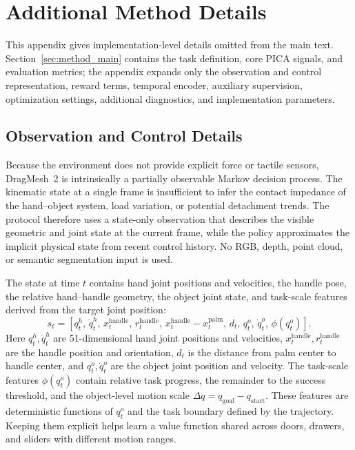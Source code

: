 \appendix

\section{Additional Method Details}
\label{sec:framework}

This appendix gives implementation-level details omitted from the
main text. Section~\ref{sec:method_main} contains the task
definition, core PICA signals, and evaluation metrics; the appendix
expands only the observation and control representation, reward
terms, temporal encoder, auxiliary supervision, optimization
settings, additional diagnostics, and implementation parameters.

\subsection{Observation and Control Details}
\label{sec:obs}

Because the environment does not provide explicit force or tactile
sensors, DragMesh~2 is intrinsically a partially observable Markov
decision process. The kinematic state at a single frame is
insufficient to infer the contact impedance of the hand--object
system, load variation, or potential detachment trends. The protocol
therefore uses a state-only observation that describes the visible
geometric and joint state at the current frame, while the policy
approximates the implicit physical state from recent control
history. No RGB, depth, point cloud, or semantic segmentation input
is used.

The state at time $t$ contains hand joint positions and velocities,
the handle pose, the relative hand--handle geometry, the object
joint state, and task-scale features derived from the target joint
position:
\begin{equation}
s_t = \left[
q_t^h,\,\dot q_t^h,\,
x_t^{\mathrm{handle}},\,r_t^{\mathrm{handle}},\,
x_t^{\mathrm{handle}}-x_t^{\mathrm{palm}},\,
d_t,\,
q_t^o,\,\dot q_t^o,\,
\phi(q_t^o)
\right].
\label{eq:state}
\end{equation}
Here $q_t^h,\dot q_t^h$ are 51-dimensional hand joint positions and
velocities, $x_t^{\mathrm{handle}},r_t^{\mathrm{handle}}$ are the
handle position and orientation, $d_t$ is the distance from palm
center to handle center, and $q_t^o,\dot q_t^o$ are the object joint
position and velocity. The task-scale features $\phi(q_t^o)$ contain
relative task progress, the remainder to the success threshold, and
the object-level motion scale $\Delta q =
q_{\mathrm{goal}}-q_{\mathrm{start}}$. These features are
deterministic functions of $q_t^o$ and the task boundary defined by
the trajectory. Keeping them explicit helps learn a value function
shared across doors, drawers, and sliders with different motion
ranges.

